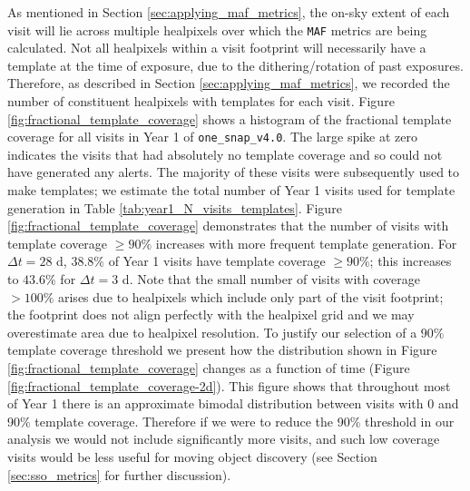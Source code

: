 \documentclass[preprintm,linenumbers]{aastex631}
\newcommand{\baseline}{\texttt{one\_snap\_v4.0}\xspace}
\newcommand{\nside}{\texttt{nside}\xspace}
\newcommand{\maf}{\texttt{MAF}\xspace}
\begin{document}
		As mentioned in Section \ref{sec:applying_maf_metrics}, the on-sky extent of each visit will lie across multiple healpixels over which the \maf metrics are being calculated.
		Not all healpixels within a visit footprint will necessarily have a template at the time of exposure, due to the dithering/rotation of past exposures.
		Therefore, as described in Section \ref{sec:applying_maf_metrics}, we recorded the number of constituent healpixels with templates for each visit.
		Figure \ref{fig:fractional_template_coverage} shows a histogram of the fractional template coverage for all visits in Year 1 of \baseline.
		The large spike at zero indicates the visits that had absolutely no template coverage and so could not have generated any alerts.
  The majority of these visits were subsequently used to make templates; we estimate the total number of Year 1 visits used for template generation in Table \ref{tab:year1_N_visits_templates}.
Figure \ref{fig:fractional_template_coverage} demonstrates that the number of visits with template coverage $\geq90\%$ increases with more frequent template generation.
For $\Delta t = 28$ d, $38.8\%$ of Year 1 visits have template coverage $\geq90\%$; this increases to $43.6\%$ for $\Delta t = 3$ d.
		Note that the small number of visits with coverage $>100\%$ arises due to healpixels which include only part of the visit footprint; the footprint does not align perfectly with the healpixel grid and we may overestimate area due to healpixel resolution.
  To justify our selection of a $90\%$ template coverage threshold we present how the distribution shown in Figure \ref{fig:fractional_template_coverage} changes as a function of time (Figure \ref{fig:fractional_template_coverage-2d}).
  This figure shows that throughout most of Year 1 there is an approximate bimodal distribution between visits with 0 and 90\% template coverage.
  Therefore if we were to reduce the 90\% threshold in our analysis we would not include significantly more visits, and such low coverage visits would be less useful for moving object discovery (see Section \ref{sec:sso_metrics} for further discussion).
\end{document}
